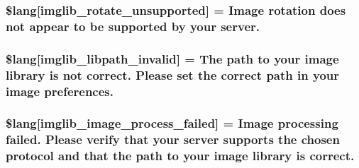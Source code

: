\subsubsection[{\$lang}]{\setlength{\rightskip}{0pt plus 5cm}\$lang\mbox{[}\textquotesingle{}imglib\+\_\+rotate\+\_\+unsupported\textquotesingle{}\mbox{]} = \textquotesingle{}Image rotation does not appear to be supported by your server.\textquotesingle{}}\label{system_2language_2english_2imglib__lang_8php_ab1c77c6b58fc5bf8e979ab4237ec87e7}
\hypertarget{system_2language_2english_2imglib__lang_8php_a8f190c17a02ca89334c8bf0a04333f65}{}
\subsubsection[{\$lang}]{\setlength{\rightskip}{0pt plus 5cm}\$lang\mbox{[}\textquotesingle{}imglib\+\_\+libpath\+\_\+invalid\textquotesingle{}\mbox{]} = \textquotesingle{}The path to your image library is not correct. Please set the correct path in your image preferences.\textquotesingle{}}\label{system_2language_2english_2imglib__lang_8php_a8f190c17a02ca89334c8bf0a04333f65}
\hypertarget{system_2language_2english_2imglib__lang_8php_a9ac6659eb97dd12e5c714cc9635cf22e}{}
\subsubsection[{\$lang}]{\setlength{\rightskip}{0pt plus 5cm}\$lang\mbox{[}\textquotesingle{}imglib\+\_\+image\+\_\+process\+\_\+failed\textquotesingle{}\mbox{]} = \textquotesingle{}Image processing failed. Please verify that your server supports the chosen protocol and that the path to your image library is correct.\textquotesingle{}}\label{system_2language_2english_2imglib__lang_8php_a9ac6659eb97dd12e5c714cc9635cf22e}
\hypertarget{system_2language_2english_2imglib__lang_8php_a1110d59ea8fd0564e78068dbda3438fb}{}
